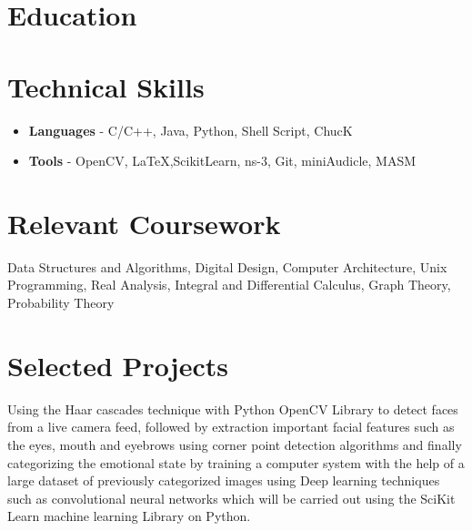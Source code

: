 \documentclass[11pt,a4paper,roman]{moderncv}        %
\title{}                               %
\begin{document}
\makecvtitle

\footnotesize{\section{\small{Education}}}


\section{\small{Technical Skills}}
\begin{itemize}
\item{\textbf{Languages} - C/C++, Java, Python, Shell Script, ChucK}
\item{\textbf{Tools} - OpenCV,  \LaTeX ,ScikitLearn, ns-3, Git, miniAudicle, MASM}
\end{itemize}

\section{\small{Relevant Coursework}}

Data Structures and Algorithms, Digital Design, Computer Architecture, Unix Programming, Real Analysis, Integral and Differential Calculus, Graph Theory, Probability Theory

\section{\small{Selected Projects}}
Using the Haar cascades technique with Python OpenCV Library to detect faces from a live camera feed,  followed by extraction important facial features such as the eyes, mouth and eyebrows using corner point detection algorithms and finally categorizing the emotional state by training a computer system with the help of a large dataset of previously categorized images using Deep learning techniques such as convolutional neural networks which will be carried out using the SciKit Learn machine learning Library on Python.
\end{document}
